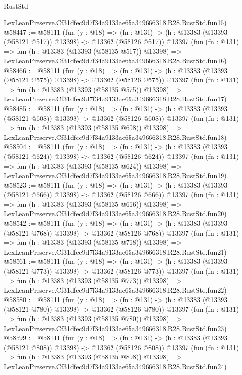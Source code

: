 \begin{lexlean}{RustStd}
\begin{coremodule}
    LexLeanPreserve.Cf31dfec9d7f34a9133ae65a349666318.R28.RustStd.fun15)
@58447 := @58111
    (fun (y : @18) =>
    (fn : @131) -> (h : @13383 (@13393 (@58121 @517)) @13398) -> @13362 (@58126 @517))
    @13397
    (fun (fn : @131) =>
    fun (h : @13383 (@13393 (@58135 @517)) @13398) =>
    LexLeanPreserve.Cf31dfec9d7f34a9133ae65a349666318.R28.RustStd.fun16)
@58466 := @58111
    (fun (y : @18) =>
    (fn : @131) -> (h : @13383 (@13393 (@58121 @575)) @13398) -> @13362 (@58126 @575))
    @13397
    (fun (fn : @131) =>
    fun (h : @13383 (@13393 (@58135 @575)) @13398) =>
    LexLeanPreserve.Cf31dfec9d7f34a9133ae65a349666318.R28.RustStd.fun17)
@58485 := @58111
    (fun (y : @18) =>
    (fn : @131) -> (h : @13383 (@13393 (@58121 @608)) @13398) -> @13362 (@58126 @608))
    @13397
    (fun (fn : @131) =>
    fun (h : @13383 (@13393 (@58135 @608)) @13398) =>
    LexLeanPreserve.Cf31dfec9d7f34a9133ae65a349666318.R28.RustStd.fun18)
@58504 := @58111
    (fun (y : @18) =>
    (fn : @131) -> (h : @13383 (@13393 (@58121 @624)) @13398) -> @13362 (@58126 @624))
    @13397
    (fun (fn : @131) =>
    fun (h : @13383 (@13393 (@58135 @624)) @13398) =>
    LexLeanPreserve.Cf31dfec9d7f34a9133ae65a349666318.R28.RustStd.fun19)
@58523 := @58111
    (fun (y : @18) =>
    (fn : @131) -> (h : @13383 (@13393 (@58121 @666)) @13398) -> @13362 (@58126 @666))
    @13397
    (fun (fn : @131) =>
    fun (h : @13383 (@13393 (@58135 @666)) @13398) =>
    LexLeanPreserve.Cf31dfec9d7f34a9133ae65a349666318.R28.RustStd.fun20)
@58542 := @58111
    (fun (y : @18) =>
    (fn : @131) -> (h : @13383 (@13393 (@58121 @768)) @13398) -> @13362 (@58126 @768))
    @13397
    (fun (fn : @131) =>
    fun (h : @13383 (@13393 (@58135 @768)) @13398) =>
    LexLeanPreserve.Cf31dfec9d7f34a9133ae65a349666318.R28.RustStd.fun21)
@58561 := @58111
    (fun (y : @18) =>
    (fn : @131) -> (h : @13383 (@13393 (@58121 @773)) @13398) -> @13362 (@58126 @773))
    @13397
    (fun (fn : @131) =>
    fun (h : @13383 (@13393 (@58135 @773)) @13398) =>
    LexLeanPreserve.Cf31dfec9d7f34a9133ae65a349666318.R28.RustStd.fun22)
@58580 := @58111
    (fun (y : @18) =>
    (fn : @131) -> (h : @13383 (@13393 (@58121 @780)) @13398) -> @13362 (@58126 @780))
    @13397
    (fun (fn : @131) =>
    fun (h : @13383 (@13393 (@58135 @780)) @13398) =>
    LexLeanPreserve.Cf31dfec9d7f34a9133ae65a349666318.R28.RustStd.fun23)
@58599 := @58111
    (fun (y : @18) =>
    (fn : @131) -> (h : @13383 (@13393 (@58121 @808)) @13398) -> @13362 (@58126 @808))
    @13397
    (fun (fn : @131) =>
    fun (h : @13383 (@13393 (@58135 @808)) @13398) =>
    LexLeanPreserve.Cf31dfec9d7f34a9133ae65a349666318.R28.RustStd.fun24)

\end{coremodule}
\end{lexlean}
